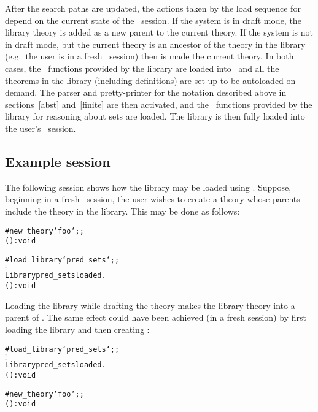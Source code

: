 After the search paths are updated, the actions taken by the load sequence for
 depend on the current state of the \HOL\ session. If the system
is in draft mode, the library theory  is added as a new parent
to the current theory.  If the system is not in draft mode, but the current
theory is an ancestor of the  theory in the library (e.g.\ the
user is in a fresh \HOL\ session) then  is made the current
theory.  In both cases, the \ML\ functions provided by the library are loaded
into \HOL\, and all the theorems in the library (including definitions) are set
up to be autoloaded on demand.  The parser and pretty-printer for the notation
described above in sections~\ref{abst} and~\ref{finite} are then activated, and
the \ML\ functions provided by the library for reasoning about sets are loaded.
The  library is then fully loaded into the user's \HOL\ session.

\subsection{Example session}

The following session shows how the  library may be loaded using
. Suppose, beginning in a fresh \HOL\ session, the user
wishes to create a theory  whose parents include the theory
 in the library. This may be done as follows:

\setcounter{sessioncount}{1}
\begin{session}
\begin{alltt}
#new_theory `foo`;;
() : void

#load_library `pred_sets`;;
  \(\vdots\)
Library pred_sets loaded.
() : void
\end{alltt}\end{session}

\noindent Loading the library while drafting the theory  makes the
library theory  into a parent of .  The same effect
could have been achieved (in a fresh session) by first loading the library and
then creating :

\setcounter{sessioncount}{1}
\begin{session}
\begin{alltt}
#load_library `pred_sets`;;
  \(\vdots\)
Library pred_sets loaded.
() : void

#new_theory `foo`;;
() : void
\end{alltt}\end{session}

